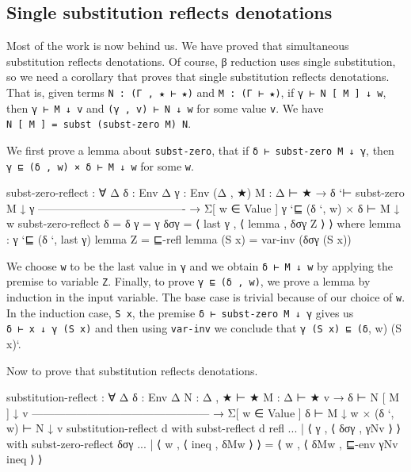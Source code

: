 \hypertarget{single-substitution-reflects-denotations}{%
\subsection{Single substitution reflects
denotations}\label{single-substitution-reflects-denotations}}

Most of the work is now behind us. We have proved that simultaneous
substitution reflects denotations. Of course, β reduction uses single
substitution, so we need a corollary that proves that single
substitution reflects denotations. That is, given terms
\texttt{N\ :\ (Γ\ ,\ ★\ ⊢\ ★)} and \texttt{M\ :\ (Γ\ ⊢\ ★)}, if
\texttt{γ\ ⊢\ N\ {[}\ M\ {]}\ ↓\ w}, then \texttt{γ\ ⊢\ M\ ↓\ v} and
\texttt{(γ\ ,\ v)\ ⊢\ N\ ↓\ w} for some value \texttt{v}. We have
\texttt{N\ {[}\ M\ {]}\ =\ subst\ (subst-zero\ M)\ N}.

We first prove a lemma about \texttt{subst-zero}, that if
\texttt{δ\ ⊢\ subst-zero\ M\ ↓\ γ}, then
\texttt{γ\ ⊑\ (δ\ ,\ w)\ ×\ δ\ ⊢\ M\ ↓\ w} for some \texttt{w}.

\begin{fence}
\begin{code}
subst-zero-reflect : ∀ {Δ} {δ : Env Δ} {γ : Env (Δ , ★)} {M : Δ ⊢ ★}
  → δ `⊢ subst-zero M ↓ γ
    ----------------------------------------
  → Σ[ w ∈ Value ] γ `⊑ (δ `, w) × δ ⊢ M ↓ w
subst-zero-reflect {δ = δ} {γ = γ} δσγ = ⟨ last γ , ⟨ lemma , δσγ Z ⟩ ⟩
  where
  lemma : γ `⊑ (δ `, last γ)
  lemma Z  =  ⊑-refl
  lemma (S x) = var-inv (δσγ (S x))
\end{code}
\end{fence}

We choose \texttt{w} to be the last value in \texttt{γ} and we obtain
\texttt{δ\ ⊢\ M\ ↓\ w} by applying the premise to variable \texttt{Z}.
Finally, to prove \texttt{γ\ ⊑\ (δ\ ,\ w)}, we prove a lemma by
induction in the input variable. The base case is trivial because of our
choice of \texttt{w}. In the induction case, \texttt{S\ x}, the premise
\texttt{δ\ ⊢\ subst-zero\ M\ ↓\ γ} gives us
\texttt{δ\ ⊢\ x\ ↓\ γ\ (S\ x)} and then using \texttt{var-inv} we
conclude that \texttt{γ\ (S\ x)\ ⊑\ (δ}, w) (S x)`.

Now to prove that substitution reflects denotations.

\begin{fence}
\begin{code}
substitution-reflect : ∀ {Δ} {δ : Env Δ} {N : Δ , ★ ⊢ ★} {M : Δ ⊢ ★} {v}
  → δ ⊢ N [ M ] ↓ v
    ------------------------------------------------
  → Σ[ w ∈ Value ] δ ⊢ M ↓ w  ×  (δ `, w) ⊢ N ↓ v
substitution-reflect d with subst-reflect d refl
...  | ⟨ γ , ⟨ δσγ , γNv ⟩ ⟩ with subst-zero-reflect δσγ
...    | ⟨ w , ⟨ ineq , δMw ⟩ ⟩ = ⟨ w , ⟨ δMw , ⊑-env γNv ineq ⟩ ⟩
\end{code}
\end{fence}

